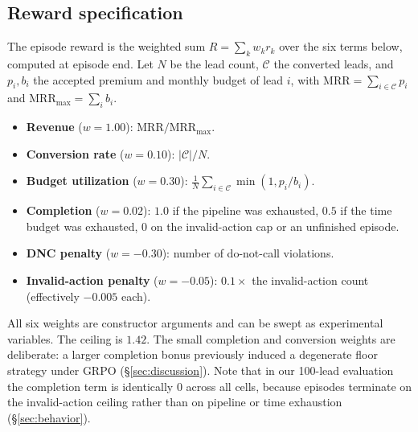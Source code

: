 \documentclass{article} %
\begin{document}
\subsection{Reward specification}
\label{app:reward}
The episode reward is the weighted sum $R = \sum_k w_k r_k$ over the six terms below, computed at episode end. Let
$N$ be the lead count, $\mathcal{C}$ the converted leads, and $p_i,b_i$ the accepted premium and monthly budget of
lead $i$, with $\mathrm{MRR}=\sum_{i\in\mathcal{C}} p_i$ and $\mathrm{MRR}_{\max}=\sum_i b_i$.
\begin{itemize}
\itemsep0.1em
\item \textbf{Revenue} ($w{=}1.00$): $\mathrm{MRR}/\mathrm{MRR}_{\max}$.
\item \textbf{Conversion rate} ($w{=}0.10$): $|\mathcal{C}|/N$.
\item \textbf{Budget utilization} ($w{=}0.30$): $\frac{1}{N}\sum_{i\in\mathcal{C}}\min(1, p_i/b_i)$.
\item \textbf{Completion} ($w{=}0.02$): $1.0$ if the pipeline was exhausted, $0.5$ if the time budget was exhausted,
$0$ on the invalid-action cap or an unfinished episode.
\item \textbf{DNC penalty} ($w{=}-0.30$): number of do-not-call violations.
\item \textbf{Invalid-action penalty} ($w{=}-0.05$): $0.1\times$ the invalid-action count (effectively $-0.005$ each).
\end{itemize}
All six weights are constructor arguments and can be swept as experimental variables. The ceiling is $1.42$. The small
completion and conversion weights are deliberate: a larger completion bonus previously induced a degenerate floor strategy
under GRPO (\S\ref{sec:discussion}). Note that in our 100-lead evaluation the completion term is identically $0$ across all
cells, because episodes terminate on the invalid-action ceiling rather than on pipeline or time exhaustion
(\S\ref{sec:behavior}).
\end{document}

